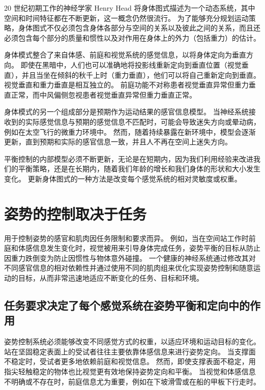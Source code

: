 20 世纪初期工作的神经学家 Henry Head 将身体图式描述为一个动态系统，其中空间和时间特征都在不断更新，这一概念仍然很流行。
为了能够充分规划运动策略，身体图式不仅必须包含身体各部分与空间的关系以及彼此之间的关系，而且还必须包含每个部分的质量和惯性以及对作用在身体上的外力（包括重力）的估计。


身体模式整合了来自体感、前庭和视觉系统的感觉信息，以将身体定向为垂直方向。
即使在黑暗中，人们也可以准确地将投影线重新定向到垂直位置（视觉垂直），并且当坐在倾斜的秋千上时（重力垂直），他们可以将自己重新定向到垂直。
视觉垂直和重力垂直是相互独立的。
前庭功能不对称患者视觉垂直异常但重力垂直正常，而中风偏侧忽视患者视觉垂直异常但重力垂直正常。


身体模式的另一个组成部分是预期作为运动结果的感官信息模型。
当神经系统接收到的实际感觉信息与预期的感觉信息不匹配时，可能会导致迷失方向或晕动病，例如在太空飞行的微重力环境中。
然而，随着持续暴露在新环境中，模型会逐渐更新，直到预期和实际的感官信息一致，并且人不再在空间上迷失方向。


平衡控制的内部模型必须不断更新，无论是在短期内，因为我们利用经验来改进我们的平衡策略，还是在长期内，随着我们年龄的增长和我们身体的形状和大小发生变化。
更新身体图式的一种方法是改变每个感觉系统的相对灵敏度或权重。



\section{姿势的控制取决于任务}

用于控制姿势的感官和肌肉因任务限制和要求而异。
例如，当在空间站工作时前庭和体感信息发生变化时，视觉被用来引导身体完成任务，姿势平衡的目标从防止因重力跌倒变为防止因惯性与物体意外碰撞。
一个健康的神经系统通过修改其对不同感官信息的相对依赖性并通过使用不同的肌肉组来优化实现姿势控制和随意运动的目标，从而非常迅速地适应不断变化的任务、目标和环境。



\subsection{任务要求决定了每个感觉系统在姿势平衡和定向中的作用}

姿势控制系统必须能够改变不同感觉方式的权重，以适应环境和运动目标的变化。
站在坚固稳定表面上的受试者往往主要依靠体感信息来进行姿势定向。
当支撑面不稳定时，受试者更多地依赖前庭和视觉信息。
然而，即使支撑表面不稳定，用指尖轻触稳定的物体也比视觉更有效地保持姿势定向和平衡。
当视觉和体感信息不明确或不存在时，前庭信息尤为重要，例如在下坡滑雪或在船的甲板下行走时。


